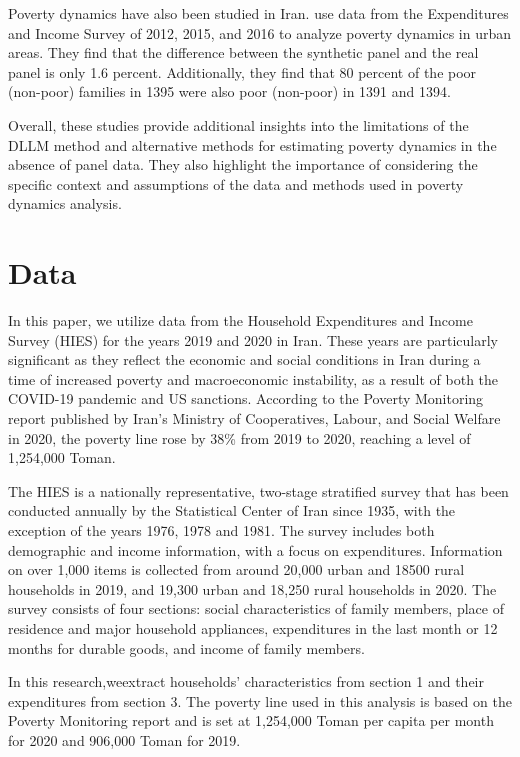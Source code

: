 \documentclass[12pt,a4paper]{article}
\begin{document}
Poverty dynamics have also been studied in Iran. \cite{گریوانی2019تحلیل} use data from the Expenditures and Income Survey of 2012, 2015, and 2016 to analyze poverty dynamics in urban areas. They find that the difference between the synthetic panel and the real panel is only 1.6 percent. Additionally, they find that 80 percent of the poor (non-poor) families in 1395 were also poor (non-poor) in 1391 and 1394.

Overall, these studies provide additional insights into the limitations of the DLLM method and alternative methods for estimating poverty dynamics in the absence of panel data. They also highlight the importance of considering the specific context and assumptions of the data and methods used in poverty dynamics analysis.

\section{Data}\label{data}
In this paper, we utilize data from the Household Expenditures and Income Survey (HIES) for the years 2019 and 2020 in Iran. These years are particularly significant as they reflect the economic and social conditions in Iran during a time of increased poverty and macroeconomic instability, as a result of both the COVID-19 pandemic and US sanctions. According to the Poverty Monitoring report published by Iran’s Ministry of Cooperatives, Labour, and Social Welfare in 2020, the poverty line rose by 38\% from 2019 to 2020, reaching a level of 1,254,000 Toman.

The HIES is a nationally representative, two-stage stratified survey that has been conducted annually by the Statistical Center of Iran since 1935, with the exception of the years 1976, 1978 and 1981. The survey includes both demographic and income information, with a focus on expenditures. Information on over 1,000 items is collected from around 20,000 urban and 18500 rural households in 2019, and 19,300 urban and 18,250 rural households in 2020. The survey consists of four sections: social characteristics of family members, place of residence and major household appliances, expenditures in the last month or 12 months for durable goods, and income of family members.

In this research,weextract households’ characteristics from section 1 and their expenditures from section 3. The poverty line used in this analysis is based on the Poverty Monitoring report and is set at 1,254,000 Toman per capita per month for 2020 and 906,000 Toman for 2019.
\end{document}
